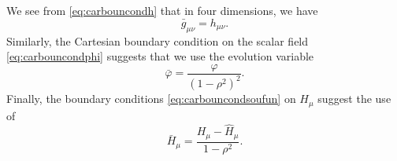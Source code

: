 \documentclass[a4paper,11pt]{article}
\numberwithin{equation}{section}
\begin{document}
We see from \eqref{eq:carbouncondh} that in four dimensions, we have 
\begin{equation}\label{eq:gbarcart}
\bar{g}_{\mu\nu}=h_{\mu\nu}.
\end{equation}
Similarly, the Cartesian boundary condition on the scalar field \eqref{eq:carbouncondphi} suggests that we use the evolution variable
\begin{equation}
\label{eq:phibarcart}
\bar{\varphi}=\frac{\varphi }{(1-\rho^2)^2}.
\end{equation}
Finally, the boundary conditions \eqref{eq:carbouncondsoufun} on $H_\mu$ suggest the use of
\begin{equation}\label{eq:soufunb}
\bar{H}_\mu=\frac{H_\mu-\hat{H}_\mu}{1-\rho^2 }.
\end{equation}

\end{document}
